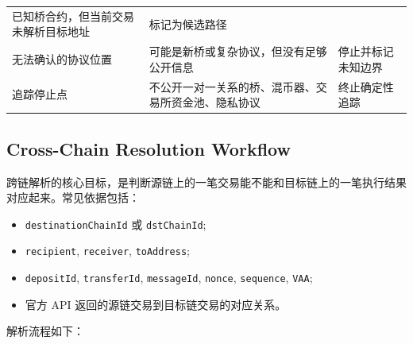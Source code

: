 \documentclass[12pt,a4paper]{ctexart}
\providecommand{\tightlist}{\setlength{\itemsep}{0pt}\setlength{\parskip}{0pt}}
\begin{document}
\begin{longtable}[]{@{}lll@{}}
\begin{minipage}[t]{0.30\columnwidth}
已知桥合约，但当前交易未解析目标地址\strut
\end{minipage} & \begin{minipage}[t]{0.30\columnwidth}\raggedright
标记为候选路径\strut
\end{minipage}\tabularnewline
\begin{minipage}[t]{0.30\columnwidth}\raggedright
无法确认的协议位置\strut
\end{minipage} & \begin{minipage}[t]{0.30\columnwidth}\raggedright
可能是新桥或复杂协议，但没有足够公开信息\strut
\end{minipage} & \begin{minipage}[t]{0.30\columnwidth}\raggedright
停止并标记未知边界\strut
\end{minipage}\tabularnewline
\begin{minipage}[t]{0.30\columnwidth}\raggedright
追踪停止点\strut
\end{minipage} & \begin{minipage}[t]{0.30\columnwidth}\raggedright
不公开一对一关系的桥、混币器、交易所资金池、隐私协议\strut
\end{minipage} & \begin{minipage}[t]{0.30\columnwidth}\raggedright
终止确定性追踪\strut
\end{minipage}\tabularnewline
\bottomrule
\end{longtable}

\hypertarget{cross-chain-resolution-workflow}{%
\subsection{Cross-Chain Resolution
Workflow}\label{cross-chain-resolution-workflow}}

跨链解析的核心目标，是判断源链上的一笔交易能不能和目标链上的一笔执行结果对应起来。常见依据包括：

\begin{itemize}
\tightlist
\item
  \texttt{destinationChainId} 或 \texttt{dstChainId};
\item
  \texttt{recipient}, \texttt{receiver}, \texttt{toAddress};
\item
  \texttt{depositId}, \texttt{transferId}, \texttt{messageId},
  \texttt{nonce}, \texttt{sequence}, \texttt{VAA};
\item
  官方 API 返回的源链交易到目标链交易的对应关系。
\end{itemize}

解析流程如下：
\end{document}
